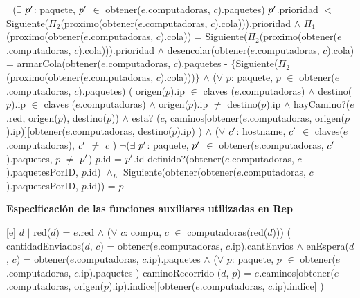 \begin{Representacion}
{	$\neg$($\exists$ $p\sp{\prime}$: paquete, $p\sp{\prime}$ $\in$ obtener($e$.computadoras, $c$).paquetes) $p\sp{\prime}$.prioridad $<$ Siguiente($\Pi_2$(proximo(obtener($e$.computadoras, $c$).cola))).prioridad $\wedge$ \newline
	$\Pi_1$(proximo(obtener($e$.computadoras, $c$).cola)) = Siguiente($\Pi_2$(proximo(obtener($e$.computadoras, $c$).cola))).prioridad $\wedge$ \newline
	desencolar(obtener($e$.computadoras, $c$).cola) = armarCola(obtener($e$.computadoras, $c$).paquetes - $\{$Siguiente($\Pi_2$(proximo(obtener($e$.computadoras, $c$).cola)))$\}$ $\wedge$
	\newline
	($\forall$ $p$: paquete, $p$ $\in$ obtener($e$.computadoras, $c$).paquetes) (
	 origen($p$).ip $\in$ claves ($e$.computadoras) $\wedge$ 
destino($p$).ip $\in$ claves ($e$.computadoras) $\wedge$ 
	 origen($p$).ip $\neq$ destino($p$).ip $\wedge$ 
	 hayCamino?($e$.red, origen($p$), destino($p$)) $\wedge$ 
	 esta? ($c$, caminos[obtener($e$.computadoras, origen($p$).ip)][obtener($e$.computadoras, destino($p$).ip) ) $\wedge$
	 ($\forall$ $c\sp{\prime}$: hostname, $c\sp{\prime}$ $\in$ claves($e$.computadoras), $c\sp{\prime}$ $\neq$ $c$ )  $\neg$($\exists$ $p\sp{\prime}$: paquete, $p\sp{\prime}$ $\in$ obtener($e$.computadoras, $c\sp{\prime}$).paquetes, $p$ $\neq$ $p\sp{\prime}$) $p$.id = $p\sp{\prime}$.id 
	definido?(obtener($e$.computadoras, $c$).paquetesPorID, $p$.id) $\wedge_L$ \newline
	Siguiente(obtener(obtener($e$.computadoras, $c$).paquetesPorID,  $p$.id)) = $p$
}

\textbf{}

\textbf{Especificaci\'on de las funciones auxiliares utilizadas en Rep}





\textbf{}

[e]{ $d$ $|$ 
red($d$) = $e$.red $\wedge$ \newline
($\forall$ $c$: compu, $c$ $\in$ computadoras(red($d$))) ( \newline
cantidadEnviados($d$, $c$) = obtener($e$.computadoras, $c$.ip).cantEnvios $\wedge$ \newline
enEspera($d$, $c$) = obtener($e$.computadoras, $c$.ip).paquetes $\wedge$ \newline
($\forall$ $p$: paquete, $p$ $\in$  obtener($e$.computadoras, $c$.ip).paquetes ) 
caminoRecorrido ($d$, $p$) = $e$.caminos[obtener($e$.computadoras, origen($p$).ip).indice][obtener($e$.computadoras, $c$.ip).indice] ) 
}

\end{Representacion}

